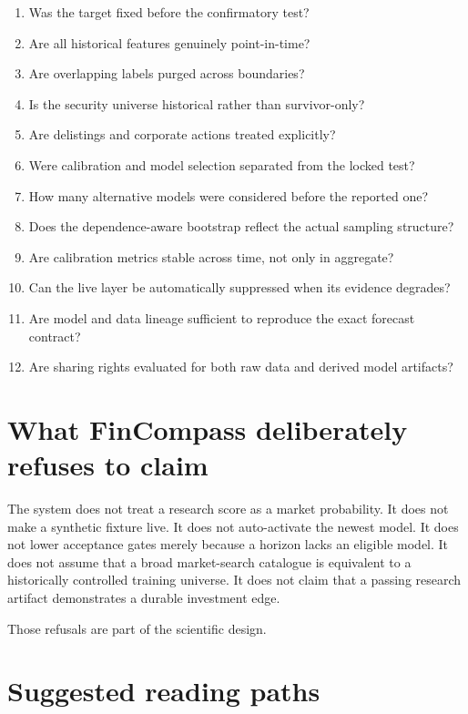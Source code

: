 \documentclass[11pt]{article}
\begin{document}
\begin{enumerate}
\item Was the target fixed before the confirmatory test?
\item Are all historical features genuinely point-in-time?
\item Are overlapping labels purged across boundaries?
\item Is the security universe historical rather than survivor-only?
\item Are delistings and corporate actions treated explicitly?
\item Were calibration and model selection separated from the locked test?
\item How many alternative models were considered before the reported one?
\item Does the dependence-aware bootstrap reflect the actual sampling structure?
\item Are calibration metrics stable across time, not only in aggregate?
\item Can the live layer be automatically suppressed when its evidence degrades?
\item Are model and data lineage sufficient to reproduce the exact forecast contract?
\item Are sharing rights evaluated for both raw data and derived model artifacts?
\end{enumerate}

\section{What FinCompass deliberately refuses to claim}

The system does not treat a research score as a market probability. It does not make a synthetic fixture live. It does not auto-activate the newest model. It does not lower acceptance gates merely because a horizon lacks an eligible model. It does not assume that a broad market-search catalogue is equivalent to a historically controlled training universe. It does not claim that a passing research artifact demonstrates a durable investment edge.

Those refusals are part of the scientific design.

\section{Suggested reading paths}
\end{document}
